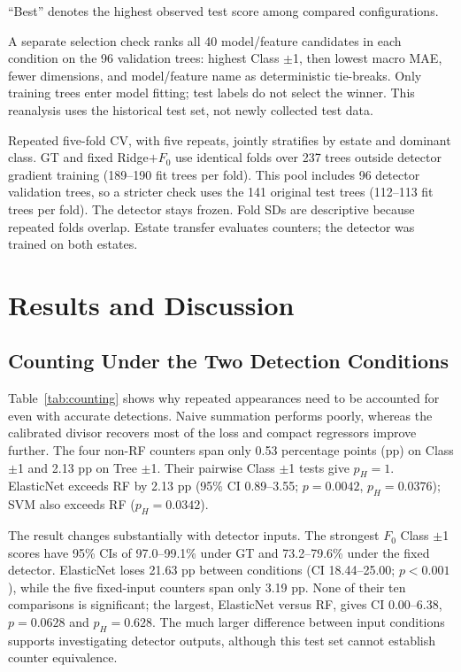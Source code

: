 \documentclass[conference,a4paper]{IEEEtran}
\begin{document}
``Best'' denotes the highest observed test score among compared configurations.

A separate selection check ranks all 40 model/feature candidates in each
condition on the 96 validation trees: highest Class $\pm$1, then lowest
macro MAE, fewer dimensions, and model/feature name as deterministic tie-breaks.
Only training trees enter model fitting; test labels do not select the winner.
This reanalysis uses the historical test set, not newly collected test data.

Repeated five-fold CV, with five repeats, jointly stratifies
by estate and dominant class. GT and fixed Ridge$+F_0$ use identical folds
over 237 trees outside detector gradient training (189--190 fit trees per fold).
This pool includes 96 detector validation trees, so a stricter check uses
the 141 original test trees (112--113 fit trees per fold). The detector stays
frozen. Fold SDs are descriptive because repeated folds overlap. Estate transfer
evaluates counters; the detector was trained on both estates.

\section{Results and Discussion}
\subsection{Counting Under the Two Detection Conditions}
\label{sec:gt}
Table~\ref{tab:counting} shows why repeated appearances need to be accounted
for even with accurate detections. Naive summation performs poorly, whereas
the calibrated divisor recovers most of the loss and compact regressors improve
further. The four non-RF counters span only 0.53 percentage points (pp) on Class
$\pm$1 and 2.13 pp on Tree $\pm$1. Their pairwise Class $\pm$1 tests give
$p_H=1$. ElasticNet exceeds RF by 2.13 pp (95\% CI 0.89--3.55;
$p=0.0042$, $p_H=0.0376$); SVM also exceeds RF ($p_H=0.0342$).

The result changes substantially with detector inputs. The strongest $F_0$
Class $\pm$1 scores have 95\% CIs of 97.0--99.1\% under GT and 73.2--79.6\%
under the fixed detector. ElasticNet loses 21.63 pp between conditions
(CI 18.44--25.00; $p<0.001$), while the five fixed-input counters span only
3.19 pp. None of their ten comparisons is significant; the largest, ElasticNet
versus RF, gives CI 0.00--6.38, $p=0.0628$ and $p_H=0.628$.
The much larger difference between input conditions supports investigating
detector outputs, although this test set cannot establish counter equivalence.
\end{document}
